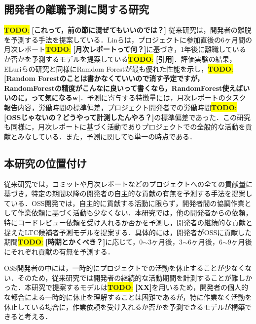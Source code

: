 \documentclass[submit,techrep,noauthor]{ipsj}
\newcommand{\todo}[1]{\colorbox{yellow}{{\bf TODO}:}{\color{red} {\textbf{[#1]}}}}
\begin{document}
\subsection{開発者の離職予測に関する研究}

\todo{これって，前の節に混ぜてもいいのでは？}
従来研究は，開発者の離脱を予測する手法を提案している．Linらは，プロジェクトに参加直後の6ヶ月間の月次レポート\todo{月次レポートって何？}に基づき，1年後に離職しているか否かを予測するモデルを提案している\todo{引用}．評価実験の結果，ELuriらの研究と同様にRamdom Forestが最も優れた性能を示し，\todo{Random Forestのことは書かなくていいので消す予定ですが，RandomForestの精度がこんなに良いって書くなら，RandomForest使えばいいのに，って気になるw}．予測に寄与する特徴量には，月次レポートのタスク報告内容，労働時間の標準偏差，プロジェクト開発者での労働時間\todo{OSSじゃないの？どうやって計測したんやろ？}の標準偏差であった．この研究も同様に，月次レポートに基づく活動でありプロジェクトでの全般的な活動を貢献とみなしている．また，予測に関しても単一の時点である．

\subsection{本研究の位置付け}
従来研究では，コミットや月次レポートなどのプロジェクトへの全ての貢献量に基づき，特定の期間以降の開発者の自主的な貢献の有無を予測する手法を提案している．OSS開発では，自主的に貢献する活動に限らず，開発者間の協調作業として作業依頼に基づく活動も少なくない．本研究では，他の開発者からの依頼，特にコードレビュー依頼を受け入れるか否かを予測し，開発者の継続的な貢献と捉えたLTC候補者予測モデルを提案する．具体的には，開発者がOSSに貢献した期間\todo{時期とかくべき？}に応じて，0$\sim$3ヶ月後，3$\sim$6ヶ月後，6$\sim$9ヶ月後にそれぞれ貢献の有無を予測する．

OSS開発者の中には，一時的にプロジェクトでの活動を休止することが少なくない．そのため，従来研究では開発者の継続的な活動期間を計測することが難しかった．本研究で提案するモデルは\todo{XX}を用いるため，開発者の個人的な都合による一時的に休止を理解することは困難であるが，特に作業なく活動を休止している場合に，作業依頼を受け入れるか否かを予測できるモデルが構築できると考える．

\end{document}

